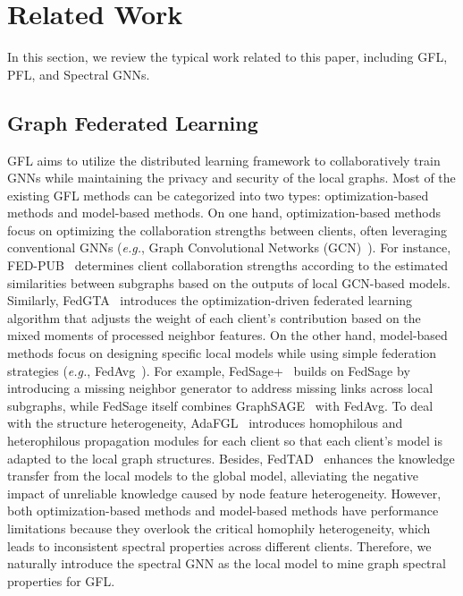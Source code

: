 \section{Related Work}
In this section, we review the typical work related to this paper, including GFL, PFL, and Spectral GNNs.

\subsection{Graph Federated Learning}
GFL aims to utilize the distributed learning framework to collaboratively train GNNs while maintaining the privacy and security of the local graphs. Most of the existing GFL methods can be categorized into two types: optimization-based methods and model-based methods. On one hand, optimization-based methods focus on optimizing the collaboration strengths between clients, often leveraging conventional GNNs (\textit{e.g.}, Graph Convolutional Networks (GCN)~\cite{kipf2017semisupervised}). For instance, FED-PUB~\cite{baek2023personalized} determines client collaboration strengths according to the estimated similarities between subgraphs based on the outputs of local GCN-based models. Similarly, FedGTA~\cite{li2023fedgta} introduces the optimization-driven federated learning algorithm that adjusts the weight of each client's contribution based on the mixed moments of processed neighbor features. On the other hand, model-based methods focus on designing specific local models while using simple federation strategies (\textit{e.g.}, FedAvg~\cite{mcmahan2017communication}). For example, FedSage+~\cite{NEURIPS2021_34adeb8e} builds on FedSage\cite{NEURIPS2021_34adeb8e} by introducing a missing neighbor generator to address missing links across local subgraphs, while FedSage itself combines GraphSAGE~\cite{NIPS2017_5dd9db5e} with FedAvg. To deal with the structure heterogeneity, AdaFGL~\cite{li2024adafgl} introduces homophilous and heterophilous propagation modules for each client so that each client's model is adapted to the local graph structures. Besides, FedTAD~\cite{zhu2024fedtad} enhances the knowledge transfer from the local models to the global model, alleviating the negative impact of unreliable knowledge caused by node feature heterogeneity. However, both optimization-based methods and model-based methods have performance limitations because they overlook the critical homophily heterogeneity, which leads to inconsistent spectral properties across different clients. Therefore, we naturally introduce the spectral GNN as the local model to mine graph spectral properties for GFL.

